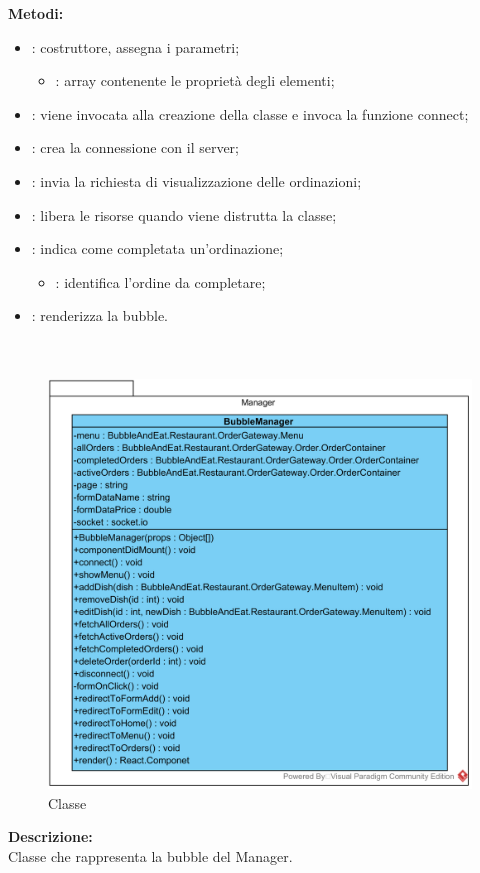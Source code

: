 \textbf{Metodi:}
\begin{itemize}
	\item {}: costruttore, assegna i parametri;
	\begin{itemize}
		\item {}: array contenente le proprietà degli elementi;
	\end{itemize}
	\item {}: viene invocata alla creazione della classe e invoca la funzione connect;
	\item {}: crea la connessione con il server;
	\item {}: invia la richiesta di visualizzazione delle ordinazioni;
	\item {}: libera le risorse quando viene distrutta la classe;
	\item {}: indica come completata un'ordinazione;
		\begin{itemize}
			\item {}: identifica l'ordine da completare;
		\end{itemize}
	\item {}: renderizza la bubble.
\end{itemize}


\paragraph[::Restaurant::Manager::BubbleManager]{\class}\mbox{}\\ \label{\class}
\begin{figure}[H]
	\centering
	\includegraphics[width=14cm]{./diagrammi/demo/client/manager.png}
	\caption{Classe \class}
\end{figure}
\textbf{Descrizione:}\\
Classe che rappresenta la bubble del Manager.

